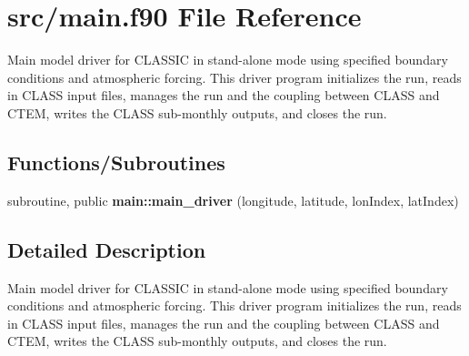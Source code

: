 \hypertarget{main_8f90}{}\section{src/main.f90 File Reference}
\label{main_8f90}


Main model driver for C\+L\+A\+S\+S\+I\+C in stand-\/alone mode using specified boundary conditions and atmospheric forcing. This driver program initializes the run, reads in C\+L\+A\+S\+S input files, manages the run and the coupling between C\+L\+A\+S\+S and C\+T\+E\+M, writes the C\+L\+A\+S\+S sub-\/monthly outputs, and closes the run.  


\subsection*{Functions/\+Subroutines}
\begin{DoxyCompactItemize}
\item 
subroutine, public {\bfseries main\+::main\+\_\+driver} (longitude, latitude, lon\+Index, lat\+Index)
\end{DoxyCompactItemize}


\subsection{Detailed Description}
Main model driver for C\+L\+A\+S\+S\+I\+C in stand-\/alone mode using specified boundary conditions and atmospheric forcing. This driver program initializes the run, reads in C\+L\+A\+S\+S input files, manages the run and the coupling between C\+L\+A\+S\+S and C\+T\+E\+M, writes the C\+L\+A\+S\+S sub-\/monthly outputs, and closes the run. 

